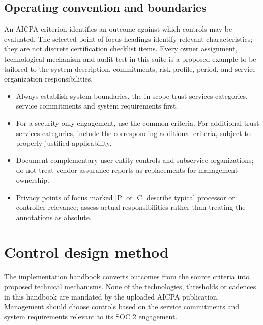 \documentclass[10pt,oneside]{report}
\begin{document}
\section*{Operating convention and boundaries}
An AICPA criterion identifies an outcome against which controls may be evaluated. The selected point-of-focus headings identify relevant characteristics; they are not discrete certification checklist items. Every owner assignment, technological mechanism and audit test in this suite is a proposed example to be tailored to the system description, commitments, risk profile, period, and service organization responsibilities.

\begin{itemize}
\item Always establish system boundaries, the in-scope trust services categories, service commitments and system requirements first.
\item For a security-only engagement, use the common criteria. For additional trust services categories, include the corresponding additional criteria, subject to properly justified applicability.
\item Document complementary user entity controls and subservice organizations; do not treat vendor assurance reports as replacements for management ownership.
\item Privacy points of focus marked [P] or [C] describe typical processor or controller relevance; assess actual responsibilities rather than treating the annotations as absolute.
\end{itemize}

\chapter{Control design method}
The implementation handbook converts outcomes from the source criteria into proposed technical mechanisms. None of the technologies, thresholds or cadences in this handbook are mandated by the uploaded AICPA publication. Management should choose controls based on the service commitments and system requirements relevant to its SOC 2 engagement.
\end{document}
